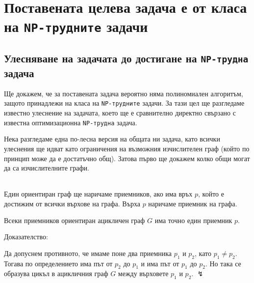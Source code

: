 \documentclass[12pt,twoside,a4paper]{article}
\begin{document}
	\section{Поставената целева задача е от класа на \texttt{NP-трудните} задачи}
	\thispagestyle{style}
	
	\subsection{Улесняване на задачата до достигане на \texttt{NP-трудна} задача}
	Ще докажем, че за поставената задача вероятно няма полиномиален алгоритъм, защото принадлежи на класа на \texttt{NP-трудните} задачи. За тази цел ще разгледаме известно улеснение на задачата, което ще е сравнително директно свързано с известна оптимизационна \texttt{NP-трудна} задача.
	
	Нека разгледаме една по-лесна версия на общата ни задача, като всички улеснения ще идват като ограничения на възможния изчислителен граф (който по принцип може да е достатъчно общ). Затова първо ще докажем колко общи могат да са изчислителните графи.
	
	\begin{definition}\label{def:sink-graph}~\\
		\indent Един ориентиран граф ще наричаме приемников, ако има връх $p$, който е достижим от всички върхове на графа. Върха $p$ наричаме приемник на графа.
	\end{definition}
	
	\begin{corollary}\label{cor:root-graph} Всеки приемников ориентиран ацикличен граф $G$ има точно един приемник $p$.
		
		\noindent Доказателство:
		
		Да допуснем противното, че имаме поне два приемника $p_1$ и $p_2$, като $p_1 \neq p_2$. Тогава по определението има път от $p_2$ до $p_1$ и има път от $p_1$ до $p_2$. Но така се образува цикъл в ацикличния граф $G$ между върховете $p_1$ и $p_2$. $\lightning$
	\end{corollary}
	
\end{document}
